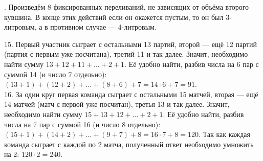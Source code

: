 \documentclass[12pt]{article}
\begin{document}
\newpage
{}. Произведём 8 фиксированных переливаний, не зависящих от объёма второго кувшина. В конце этих действий если он окажется пустым, то он был 3-литровым, а в противном случае --- 4-литровым.
\begin{center}
\begin{figure}[h!]
\end{figure}
\end{center}
15. Первый участник сыграет с остальными 13 партий, второй --- ещё 12 партий (партия с первым уже посчитана), третий 11 и так далее. Значит, необходимо найти сумму $13+12+11+\ldots+2+1.$ Её удобно найти, разбив числа на 6 пар с суммой 14 (и число 7 отдельно): $(13+1)+(12+2)+\ldots+(8+6)+7=14\cdot6+7=91.$\\
16. За один круг первая команда сыграет с остальными 15 матчей, вторая --- ещё 14 матчей (матч с первой уже посчитан), третья 13 и так далее. Значит, необходимо найти сумму $15+13+12+\ldots+2+1.$ Её удобно найти, разбив числа на 7 пар с суммой 16 (и число 8 отдельно): $(15+1)+(14+2)+\ldots+(9+7)+8=16\cdot7+8=120.$ Так как каждая команда сыграет с каждой по 2 матча, полученный ответ необходимо умножить на 2: $120\cdot2=240.$\\
\end{document}
